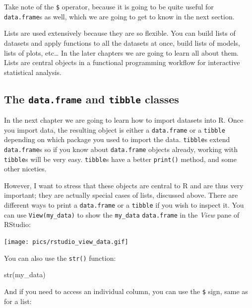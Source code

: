 \documentclass[
]{article}
\newenvironment{Shaded}{\begin{snugshade}}{\end{snugshade}}
\newcommand{\FunctionTok}[1]{\textcolor[rgb]{0.00,0.00,0.00}{#1}}
\newcommand{\NormalTok}[1]{#1}
\newcommand{\SpecialCharTok}[1]{\textcolor[rgb]{0.00,0.00,0.00}{#1}}
\begin{document}
Take note of the \texttt{\$} operator, because it is going to be quite useful for \texttt{data.frame}s as well,
which we are going to get to know in the next section.

Lists are used extensively because they are so flexible. You can build lists of datasets and apply
functions to all the datasets at once, build lists of models, lists of plots, etc\ldots{} In the later
chapters we are going to learn all about them. Lists are central objects in a functional programming
workflow for interactive statistical analysis.

\hypertarget{the-data.frame-and-tibble-classes}{%
\subsection{\texorpdfstring{The \texttt{data.frame} and \texttt{tibble} classes}{The data.frame and tibble classes}}\label{the-data.frame-and-tibble-classes}}

In the next chapter we are going to learn how to import datasets into R. Once you import data, the
resulting object is either a \texttt{data.frame} or a \texttt{tibble} depending on which package you used to
import the data. \texttt{tibble}s extend \texttt{data.frame}s so if you know about \texttt{data.frame} objects already,
working with \texttt{tibble}s will be very easy. \texttt{tibble}s have a better \texttt{print()} method, and some other
niceties.

However, I want to stress that these objects are central to R and are thus very important; they are
actually special cases of lists, discussed above. There are different ways to print a \texttt{data.frame} or
a \texttt{tibble} if you wish to inspect it. You can use \texttt{View(my\_data)} to show the \texttt{my\_data} \texttt{data.frame}
in the \emph{View} pane of RStudio:

\texttt{[image: pics/rstudio\_view\_data.gif]}

You can also use the \texttt{str()} function:

\begin{Shaded}
\begin{Highlighting}[]
\FunctionTok{str}\NormalTok{(my\_data)}
\end{Highlighting}
\end{Shaded}

And if you need to access an individual column, you can use the \texttt{\$} sign, same as for a list:

\begin{Shaded}
\end{Shaded}
\end{document}
